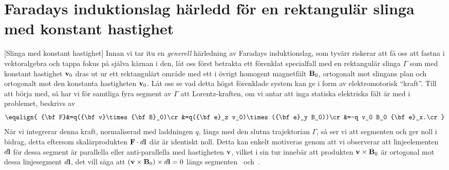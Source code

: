 \section{Faradays induktionslag h{\"a}rledd f{\"o}r en rektangul{\"a}r
  slinga med konstant hastighet}
[Slinga med konstant hastighet]
Innan vi tar itu en {\it generell} h{\"a}rledning av Faradays induktionslag,
som tyv{\"a}rr riskerar att f{\aa} oss att fastna i vektoralgebra och tappa
fokus p{\aa} sj{\"a}lva k{\"a}rnan i den, l{\aa}t oss f{\"o}rst betrakta ett
f{\"o}renklat specialfall med en rektangul{\"a}r slinga $\Gamma$ som med
konstant hastighet ${\bf v}_0$ dras ut ur ett rektangul{\"a}rt omr{\aa}de med
ett i {\"o}vrigt homogent magnetf{\"a}lt ${\bf B}_0$, ortogonalt mot slingans
plan
och ortogonalt mot den konstanta hastigheten ${\bf v}_0$.
\noindent
L{\aa}t oss se vad detta h{\"o}gst f{\"o}renklade system kan ge i form av
elektromotorisk ``kraft''. Till att b{\"o}rja med, s{\aa} har vi f{\"o}r
samtliga fyra segment av $\Gamma$ att Lorentz-kraften, om vi antar att inga
statiska elektriska f{\"a}lt {\"a}r med i problemet, beskrivs av
$$
  \eqalign{
    {\bf F}&=q({\bf v}\times{\bf B}_0)\cr
      &=q({\bf e}_z v_0)\times({\bf e}_y B_0))\cr
      &=-q v_0 B_0 {\bf e}_x.\cr
  }
$$
\vfill\eject
N{\"a}r vi integrerar denna kraft, normaliserad med laddningen $q$, l{\"a}ngs
med den slutna trajektorian $\Gamma$, s{\aa} ser vi att segmenten 
och  ger noll i bidrag, detta eftersom skal{\"a}rprodukten
${\bf F}\cdot d{\bf l}$ d{\"a}r {\"a}r identiskt noll.
Detta kan enkelt motiveras genom att vi observerar att linjeelementen $d{\bf l}$
f{\"o}r dessa segment {\"a}r parallella eller anti-parallella med hastigheten
${\bf v}$, vilket i sin tur inneb{\"a}r att produkten ${\bf v}\times{\bf B}_0$
{\"a}r ortogonal mot dessa linjesegment $d{\bf l}$, det vill s{\"a}ga att
$({\bf v}\times{\bf B}_0)\times d{\bf l}=0$ l{\"a}ngs segmenten~
och~.

